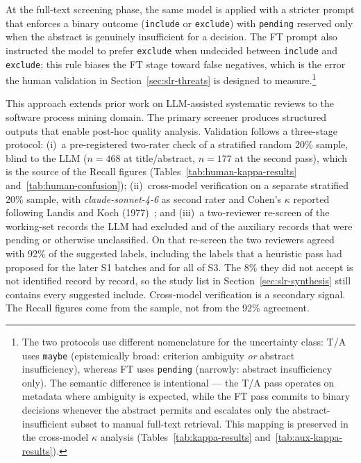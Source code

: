 At the full-text screening phase, the same model is applied with a stricter
prompt that enforces a binary outcome (\texttt{include} or \texttt{exclude})
with \texttt{pending} reserved only when the abstract is genuinely
insufficient for a decision. The FT prompt also instructed the model to
prefer \texttt{exclude} when undecided between \texttt{include} and
\texttt{exclude}; this rule biases the FT stage toward false negatives, which
is the error the human validation in Section~\ref{sec:slr-threats} is
designed to measure.\footnote{The two protocols use different
nomenclature for the uncertainty class: T/A uses \texttt{maybe}
(epistemically broad: criterion ambiguity \emph{or} abstract
insufficiency), whereas FT uses \texttt{pending} (narrowly: abstract
insufficiency only). The semantic difference is intentional --- the
T/A pass operates on metadata where ambiguity is expected, while the FT
pass commits to binary decisions whenever the abstract permits and
escalates only the abstract-insufficient subset to manual full-text
retrieval. This mapping is preserved in the cross-model $\kappa$ analysis
(Tables~\ref{tab:kappa-results} and~\ref{tab:aux-kappa-results}).}

This approach extends prior work on LLM-assisted systematic reviews
\cite{syriani2023,khraisha2024,llm4screenlit2025} to the software process
mining domain. The primary screener produces structured outputs that enable
post-hoc quality analysis. Validation follows a three-stage protocol:
(i)~a pre-registered two-rater check of a stratified random 20\% sample,
blind to the LLM ($n=468$ at title/abstract, $n=177$ at the second pass),
which is the source of the Recall figures
(Tables~\ref{tab:human-kappa-results} and~\ref{tab:human-confusion});
(ii)~cross-model verification on a separate stratified 20\% sample, with
\textit{claude-sonnet-4-6} as second rater and Cohen's $\kappa$ reported
following Landis and Koch (1977)~\cite{landiskoch1977}; and
(iii)~a two-reviewer re-screen of the working-set records the LLM had
excluded and of the auxiliary records that were pending or otherwise
unclassified. On that re-screen the two reviewers agreed with 92\% of the
suggested labels, including the labels that a heuristic pass had proposed
for the later S1 batches and for all of S3. The 8\% they did not accept is
not identified record by record, so the study list in
Section~\ref{sec:slr-synthesis} still contains every suggested include.
Cross-model verification is a secondary signal. The Recall figures come
from the sample, not from the 92\% agreement.

